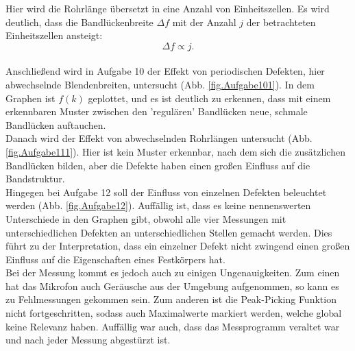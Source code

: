 Hier wird die Rohrlänge übersetzt in eine Anzahl von Einheitszellen.
Es wird deutlich, dass die Bandlückenbreite $\Delta f$ mit der Anzahl $j$ der betrachteten Einheitszellen ansteigt:
\begin{equation*}
  \Delta f \propto j.
\end{equation*}
\\Anschließend wird in Aufgabe 10 der Effekt von periodischen Defekten, hier abwechselnde Blendenbreiten, untersucht (Abb. \ref{fig.Aufgabe101}).
In dem Graphen ist $f(k)$ geplottet, und es ist deutlich zu erkennen, dass mit einem erkennbaren Muster zwischen den 'regulären' Bandlücken neue, schmale Bandlücken auftauchen.
\\Danach wird der Effekt von abwechselnden Rohrlängen untersucht (Abb. \ref{fig.Aufgabe111}).
Hier ist kein Muster erkennbar, nach dem sich die zusätzlichen Bandlücken bilden, aber die Defekte haben einen großen Einfluss auf die Bandstruktur.
\\Hingegen bei Aufgabe 12 soll der Einfluss von einzelnen Defekten beleuchtet werden (Abb. \ref{fig.Aufgabe12}).
Auffällig ist, dass es keine nennenswerten Unterschiede in den Graphen gibt, obwohl alle vier Messungen mit unterschiedlichen Defekten an unterschiedlichen Stellen gemacht werden.
Dies führt zu der Interpretation, dass ein einzelner Defekt nicht zwingend einen großen Einfluss auf die Eigenschaften eines Festkörpers hat.
\\Bei der Messung kommt es jedoch auch zu einigen Ungenauigkeiten.
Zum einen hat das Mikrofon auch Geräusche aus der Umgebung aufgenommen, so kann es zu Fehlmessungen gekommen sein.
Zum anderen ist die Peak-Picking Funktion nicht fortgeschritten, sodass auch Maximalwerte markiert werden, welche global keine Relevanz haben.
Auffällig war auch, dass das Messprogramm veraltet war und nach jeder Messung abgestürzt ist.
